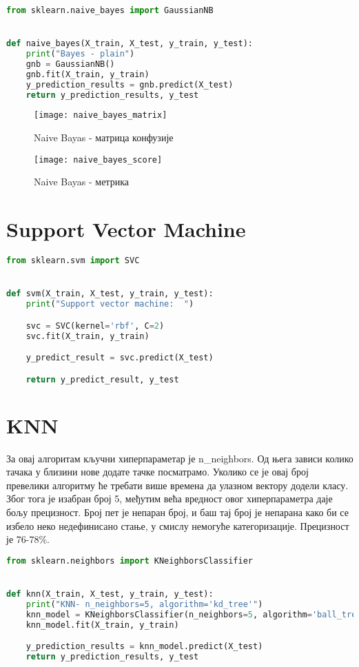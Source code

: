 \documentclass[11pt]{article} %
\begin{document}
\begin{lstlisting}[language=Python,title=Пример 7. ]
from sklearn.naive_bayes import GaussianNB


def naive_bayes(X_train, X_test, y_train, y_test):
    print("Bayes - plain")
    gnb = GaussianNB()
    gnb.fit(X_train, y_train)
    y_prediction_results = gnb.predict(X_test)
    return y_prediction_results, y_test
\end{lstlisting}

\begin{figure}[h]
\centering
	\texttt{[image: naive\_bayes\_matrix]} 
	\caption{Naive Bayas - матрица конфузије} 
\end{figure}

\begin{figure}[h]
\centering
	\texttt{[image: naive\_bayes\_score]} 
	\caption{Naive Bayas - метрика} 
\end{figure}


\section{Support Vector Machine}

\begin{lstlisting}[language=Python,title=Пример 8. ]
from sklearn.svm import SVC


def svm(X_train, X_test, y_train, y_test):
    print("Support vector machine:  ")

    svc = SVC(kernel='rbf', C=2)
    svc.fit(X_train, y_train)

    y_predict_result = svc.predict(X_test)

    return y_predict_result, y_test
\end{lstlisting}


\section{KNN}
За овај алгоритам кључни хиперпараметар је n\_neighbors. Од њега зависи колико тачака у близини нове додате тачке посматрамо. Уколико се је овај број превелики алгоритму ће требати више времена да улазном вектору додели класу. Због тога је изабран број 5, међутим већа вредност овог хиперпараметра даје бољу прецизност. Број пет је непаран број, и баш тај број је непарана како би се избело неко недефинисано стање, у смислу немогуће категоризације.
	Прецизност је 76-78\%.
	
\begin{lstlisting}[language=Python,title=Пример 9. KNN /classificators/k\_nearest\_n.py ]
from sklearn.neighbors import KNeighborsClassifier


def knn(X_train, X_test, y_train, y_test):
    print("KNN- n_neighbors=5, algorithm='kd_tree'")
    knn_model = KNeighborsClassifier(n_neighbors=5, algorithm='ball_tree', p=2) # algorithm='ball_tree')
    knn_model.fit(X_train, y_train)

    y_prediction_results = knn_model.predict(X_test)
    return y_prediction_results, y_test
\end{lstlisting}
\end{document}
